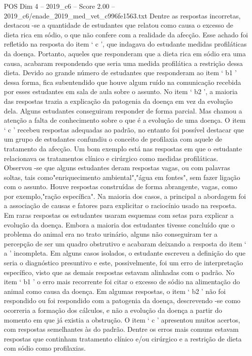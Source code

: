\begin{textsample}{POS Dim 4 – 2019\_c6 – Score 2.00 – 2019\_c6/enade\_2019\_med\_vet\_c996fe1563.txt}
Dentre as respostas incorretas, destacou -se a quantidade de estudantes que relatou como causa o excesso de dieta rica em sódio, o que não confere com a realidade da afecção.
Esse achado foi refletido na resposta do item ‘ c ’, que indagava do estudante medidas profiláticas da doença.
Portanto, aqueles que responderam que a dieta rica em sódio era uma causa, acabaram respondendo que seria uma medida profilática a restrição dessa dieta.
Devido ao grande número de estudantes que responderam ao item ‘ b1 ’ dessa forma, fica subentendido que houve algum ruído na comunicação recebida por esses estudantes em sala de aula sobre o assunto.
No item ‘ b2 ’, a maioria das respostas trazia a explicação da patogenia da doença em vez da evolução dela.
Alguns estudantes conseguiram responder de forma parcial.
Mas chamou a atenção a falta de conhecimento sobre o que é a evolução de uma doença.
O item ‘ c ’ recebeu respostas adequadas ao padrão, no entanto foi possível destacar que um grupo de estudantes confundiu o conceito de profilaxia com aquele de tratamento da afecção.
Um bom exemplo está nas respostas em que o estudante relacionava os tratamentos clínico e cirúrgico como medidas profiláticas.
Observou -se que alguns estudantes deram respostas vagas, ou com palavras soltas, tais como"enriquecimento ambiental","água em fontes", sem fazer ligação com o assunto.
Houve respostas construídas de forma abrangente, vagas, como por exemplo,"ração específica".
Na maioria dos casos, a principal a abordagem foi a associação de causas e fatores para explicitar o raciocínio usado na resposta.
Em raras respostas os estudantes usaram esquemas com setas para explicar a evolução da doença.
Embora a maioria dos estudantes tivesse concluído que o problema do animal era no trato urinário, alguns não conseguiram ter a percepção de ser um quadro obstrutivo e acabaram deixando a resposta do item ‘ a ’ incompleta.
Em alguns casos isolados, o estudante escreveu a definição do que seria o diagnóstico presuntivo e este, possivelmente, foi um erro de interpretação específico, visto que as demais respostas estavam alinhadas com o padrão.
No item ‘ b1 ’ o erro mais recorrente foi citar o excesso de sódio na alimentação do animal como causa da doença.
Em algumas respostas, o item ‘ b2 ’ não foi respondido ou foi respondido com a patogenia da doença, descrevendo -se como ocorreria a formação dos cálculos, e não a evolução da doença a partir do momento em que já existia a obstrução.
O item ‘ c ’ apresentou muitos acertos, com respostas semelhantes às do padrão.
Dentre os erros mais comuns estavam respostas que continham tratamento clínico e/ou cirúrgico e a restrição de dieta com sódio como profilaxias.

\end{textsample}
